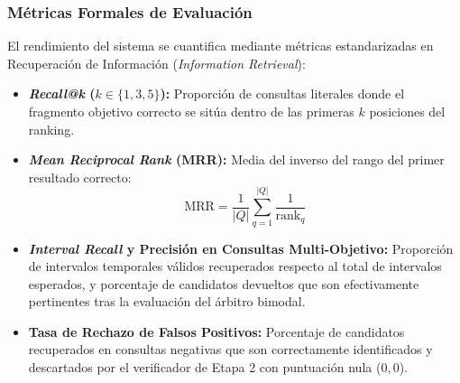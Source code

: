 \subsubsection{Métricas Formales de Evaluación}
El rendimiento del sistema se cuantifica mediante métricas estandarizadas en Recuperación de Información (\textit{Information Retrieval}):
\begin{itemize}
    \item \textbf{\textit{Recall@k} ($k \in \{1, 3, 5\}$):} Proporción de consultas literales donde el fragmento objetivo correcto se sitúa dentro de las primeras $k$ posiciones del ranking.
    \item \textbf{\textit{Mean Reciprocal Rank} (MRR):} Media del inverso del rango del primer resultado correcto:
    \begin{equation}
        \text{MRR} = \frac{1}{|Q|} \sum_{q=1}^{|Q|} \frac{1}{\text{rank}_q}
    \end{equation}
    \item \textbf{\textit{Interval Recall} y Precisión en Consultas Multi-Objetivo:} Proporción de intervalos temporales válidos recuperados respecto al total de intervalos esperados, y porcentaje de candidatos devueltos que son efectivamente pertinentes tras la evaluación del árbitro bimodal.
    \item \textbf{Tasa de Rechazo de Falsos Positivos:} Porcentaje de candidatos recuperados en consultas negativas que son correctamente identificados y descartados por el verificador de Etapa 2 con puntuación nula ($0,0$).
\end{itemize}
